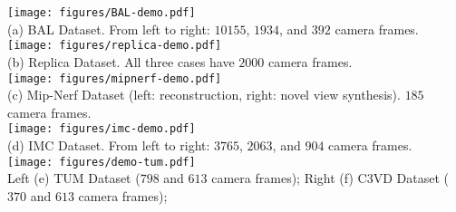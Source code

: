 
\begin{minipage}{\textwidth}
\centering
\vspace{3mm}
\texttt{[image: figures/BAL-demo.pdf]}\\
\vspace{-1mm}
(a) BAL Dataset. From left to right: $10155$, $1934$, and $392$ camera frames.\\
\texttt{[image: figures/replica-demo.pdf]}\\
\vspace{-1mm}
(b) Replica Dataset. All three cases have $2000$ camera frames. \\
\texttt{[image: figures/mipnerf-demo.pdf]}\\
\vspace{-1mm}
(c) Mip-Nerf Dataset (left: reconstruction, right: novel view synthesis). $185$ camera frames.\\
\texttt{[image: figures/imc-demo.pdf]}\\
\vspace{-1mm}
(d) IMC Dataset. From left to right: $3765$, $2063$, and $904$ camera frames. \\
\texttt{[image: figures/demo-tum.pdf]}\\
\vspace{-1mm}
Left (e) TUM Dataset ($798$ and $613$ camera frames); Right (f) C3VD Dataset ($370$ and $613$ camera frames);
\vspace{-1mm}
\vspace{-1mm}
\end{minipage}
